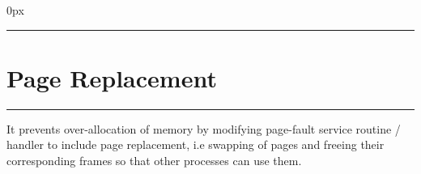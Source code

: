 \documentclass[12pt,onecolumn]{IEEEtran}
\begin{document}
% 
\maketitle
\tableofcontents
\bigskip
\renewcommand{\thefigure}{\theenumi}
\renewcommand{\thetable}{\theenumi}

\parindent 0px


\rule{\textwidth}{0.4mm}  
\section{Page Replacement}
\rule{\textwidth}{0.4mm}  
It prevents over-allocation of memory by modifying page-fault service routine / handler to include page replacement, 
i.e swapping of pages and freeing their corresponding frames so that other processes can use them.
\vspace{3mm}
\end{document}
